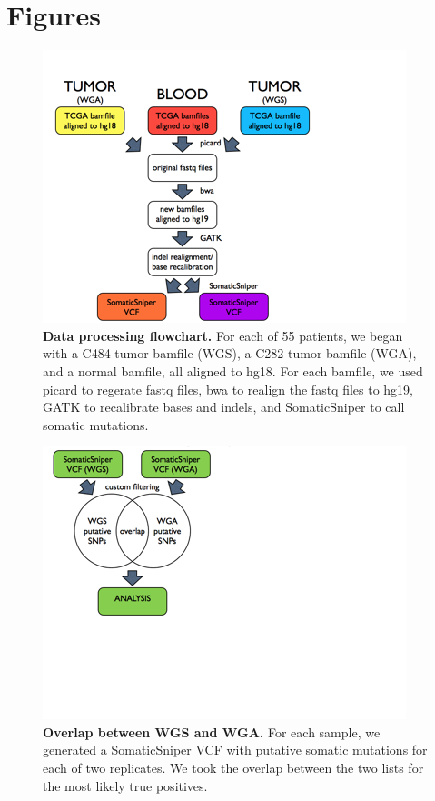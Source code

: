 \documentclass[11pt]{article} %
\begin{document}
\section{Figures}

\begin{figure}
\includegraphics[scale=1.0]{data_processing_flowchart_2.png}
\caption{\textbf{Data processing flowchart.} For each of 55 patients, we began with a C484 tumor bamfile (WGS), a C282 tumor bamfile (WGA), and a normal bamfile, all aligned to hg18. For each bamfile, we used picard to regerate fastq files, bwa to realign the fastq files to hg19, GATK to recalibrate bases and indels, and SomaticSniper to call somatic mutations.}
\end{figure}

\begin{figure}
\includegraphics[scale=1.0]{overlap_explained.png}
\caption{\textbf{Overlap between WGS and WGA.} For each sample, we generated a SomaticSniper VCF with putative somatic mutations for each of two replicates. We took the overlap between the two lists for the most likely true positives.}
\end{figure}
\end{document}
